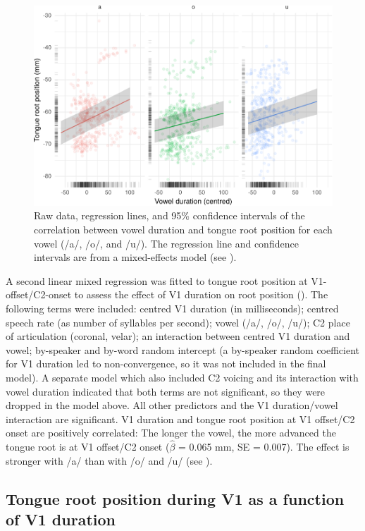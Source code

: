 \documentclass[preprint]{JASAnew}
\begin{document}
\label{s:trp-vdur}

\begin{figure}[H]
\includegraphics[width=\linewidth]{./Figure5-1} \caption{Raw data, regression lines, and 95\% confidence intervals of the correlation between vowel duration and tongue root position for each vowel (/a/, /o/, and /u/). The regression line and confidence intervals are from a mixed-effects model (see ).}\label{f:Figure5}
\end{figure}

A second linear mixed regression was fitted to tongue root position at
V1-offset/C2-onset to assess the effect of V1 duration on root position
(). The following terms were included: centred
V1 duration (in milliseconds); centred speech rate (as number of
syllables per second); vowel (/a/, /o/, /u/); C2 place of articulation
(coronal, velar); an interaction between centred V1 duration and vowel;
by-speaker and by-word random intercept (a by-speaker random coefficient
for V1 duration led to non-convergence, so it was not included in the
final model). A separate model which also included C2 voicing and its
interaction with vowel duration indicated that both terms are not
significant, so they were dropped in the model above. All other
predictors and the V1 duration/vowel interaction are significant. V1
duration and tongue root position at V1 offset/C2 onset are positively
correlated: The longer the vowel, the more advanced the tongue root is
at V1 offset/C2 onset (\(\hat{\beta}\) = 0.065 mm, SE = 0.007). The
effect is stronger with /a/ than with /o/ and /u/ (see
).

\hypertarget{tongue-root-position-during-v1-as-a-function-of-v1-duration}{%
\subsection{Tongue root position during V1 as a function of V1
duration}\label{tongue-root-position-during-v1-as-a-function-of-v1-duration}}
\end{document}
